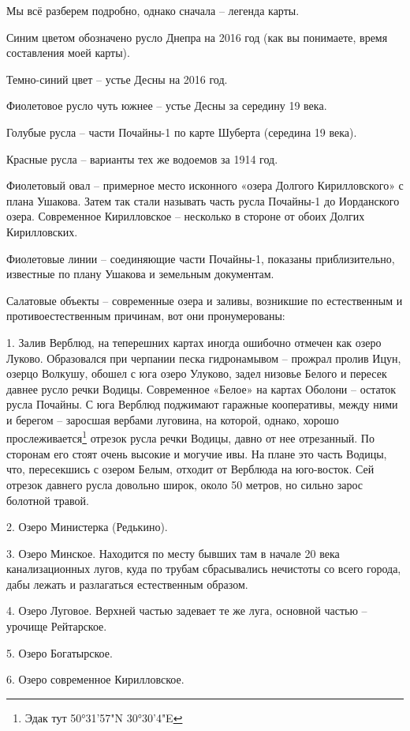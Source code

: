 Мы всё разберем подробно, однако сначала – легенда карты.

Синим цветом обозначено русло Днепра на 2016 год (как вы понимаете, время составления моей карты).

Темно-синий цвет – устье Десны на 2016 год.

Фиолетовое русло чуть южнее – устье Десны за середину 19 века.

Голубые русла – части Почайны-1 по карте Шуберта (середина 19 века).

Красные русла – варианты тех же водоемов за 1914 год.

Фиолетовый овал – примерное место исконного «озера Долгого Кирилловского» с плана Ушакова. Затем так стали называть часть русла Почайны-1 до Иорданского озера. Современное Кирилловское – несколько в стороне от обоих Долгих Кирилловских.

Фиолетовые линии – соединяющие части Почайны-1, показаны приблизительно, известные по плану Ушакова и земельным документам.

Салатовые объекты – современные озера и заливы, возникшие по естественным и противоестественным причинам, вот они пронумерованы:

1. Залив Верблюд, на теперешних картах иногда ошибочно отмечен как озеро Луково. Образовался при черпании песка гидронамывом – прожрал пролив Ицун, озерцо Волкушу, обошел с юга озеро Улуково, задел низовье Белого и пересек давнее русло речки Водицы. Современное «Белое» на картах Оболони – остаток русла Почайны. С юга Верблюд поджимают гаражные кооперативы, между ними и берегом – заросшая вербами луговина, на которой, однако, хорошо прослеживается\footnote{Эдак тут 50°31'57"N 30°30'4"E} отрезок русла речки Водицы, давно от нее отрезанный. По сторонам его стоят очень высокие и могучие ивы. На плане это часть Водицы, что, пересекшись с озером Белым, отходит от Верблюда на юго-восток. Сей отрезок давнего русла довольно широк, около 50 метров, но сильно зарос болотной травой.

2. Озеро Министерка (Редькино).

3. Озеро Минское. Находится по месту бывших там в начале 20 века канализационных лугов, куда по трубам сбрасывались нечистоты со всего города, дабы лежать и разлагаться естественным образом.

4. Озеро Луговое. Верхней частью задевает те же луга, основной частью – урочище Рейтарское.

5. Озеро Богатырское.

6. Озеро современное Кирилловское.

